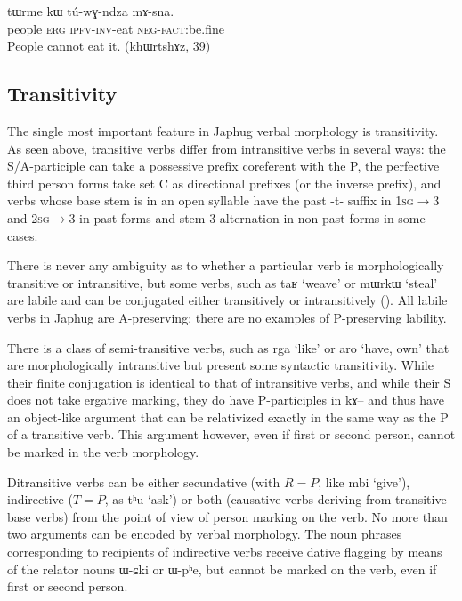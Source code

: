 \documentclass[oldfontcommands,oneside,a4paper,11pt]{article}
\newcommand{\ipa}[1]{{\phon #1}} %
\begin{document}
\begin{exe}
\ex \label{ex:tuwGndza.sna}
\gll
\ipa{tɯrme}  	\ipa{kɯ}  	\ipa{tú-wɣ-ndza}  	\ipa{mɤ-sna.}   \\
people \textsc{erg} \textsc{ipfv-inv}-eat \textsc{neg-fact}:be.fine \\
\glt People cannot eat it. (\ipa{khɯrtshɤz}, 39)
\end{exe}

\subsection{Transitivity}
The single most important feature in Japhug verbal morphology is transitivity. As seen above, transitive verbs differ from intransitive verbs in several ways: the S/A-participle can take a possessive prefix coreferent with the P, the perfective third person forms take set C as directional prefixes (or the inverse prefix), and verbs whose base stem is in an open syllable have the past \ipa{-t-} suffix in \textsc{1sg$\rightarrow$3} and \textsc{2sg$\rightarrow$3} in past forms and stem 3 alternation in non-past forms in some cases.

There is never any ambiguity as to whether a particular verb is morphologically  transitive or intransitive, but some verbs, such as \ipa{taʁ} `weave' or \ipa{mɯrkɯ} `steal' are labile and can be conjugated either transitively or intransitively (\citealt{jacques12demotion}). All labile verbs in Japhug are A-preserving; there are no examples of P-preserving lability.

There is a class of semi-transitive verbs, such as \ipa{rga} `like' or \ipa{aro} `have, own' that are morphologically intransitive but present some syntactic transitivity. While their finite conjugation is identical to that of intransitive verbs, and while their S does not take ergative marking, they do have P-participles in \ipa{kɤ--} and thus have an object-like argument that can be relativized exactly in the same way as the P of a transitive verb. This argument however, even if first or second person, cannot be marked in the verb morphology.

Ditransitive verbs can be either secundative (with $R=P$, like \ipa{mbi} `give'), indirective ($T=P$, as \ipa{tʰu} `ask') or both (causative verbs deriving from transitive base verbs) from the point of view of person marking on the verb. No more than two arguments can be encoded by verbal morphology. The noun phrases corresponding to recipients of indirective verbs receive dative flagging by means of the relator nouns \ipa{ɯ-ɕki} or \ipa{ɯ-pʰe}, but cannot be marked on the verb, even if first or second person.
\end{document}
